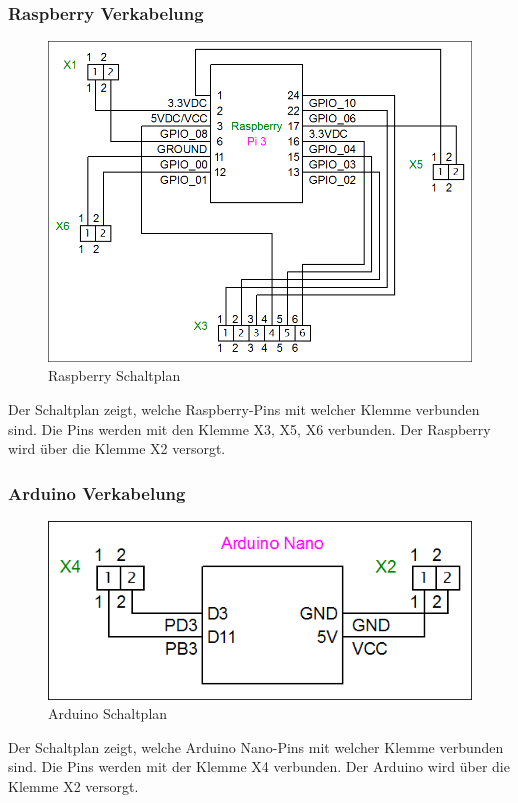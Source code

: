 \subsubsection{Raspberry Verkabelung}
\begin{figure}[H] 
\begin{center}

\includegraphics[width=15cm]{Bilder/Schaltplan/Raspberry_Verkabelung}
\caption{Raspberry Schaltplan}
\label{Rasp_Circuit}

\end{center}
\end{figure}
Der Schaltplan zeigt, welche Raspberry-Pins mit welcher Klemme verbunden sind.
Die Pins werden mit den Klemme X3, X5, X6 verbunden.
Der Raspberry wird über die Klemme X2 versorgt.

\subsubsection{Arduino Verkabelung}
\begin{figure}[H] 
\begin{center}

\includegraphics[width=15cm]{Bilder/Schaltplan/Arduino_Verkabelung}
\caption{Arduino Schaltplan}
\label{Ard_Circuit}

\end{center}
\end{figure}
Der Schaltplan zeigt, welche Arduino Nano-Pins mit welcher Klemme verbunden sind.
Die Pins werden mit der Klemme X4 verbunden.
Der Arduino wird über die Klemme X2 versorgt.


